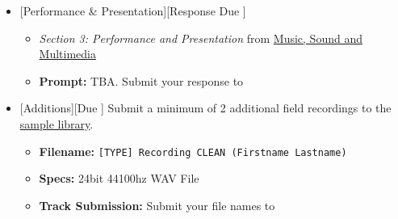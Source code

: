 \begin{itemize}[noitemsep,topsep=0pt,leftmargin=*]
\item {}[Performance \& Presentation][Response Due \dMon]
\begin{itemize}
	\item \emph{Section 3: Performance and Presentation} from \href{supplements/Music_Sound_and_Multimedia_-_From_the_Live_to_the_Virtual_(Music_and_the_Moving_Image)_(2008).pdf}{Music, Sound and Multimedia}
	\item \textbf{Prompt:} TBA. Submit your response to \discordR
\end{itemize}
\item {}[Additions][Due \dSun] \newline 
 Submit a minimum of 2 additional field recordings to the \href{\#}{sample library}.
\begin{itemize}
	\item \textbf{Filename:} \texttt{[TYPE] Recording CLEAN (Firstname Lastname)}
	\item \textbf{Specs:} 24bit 44100hz WAV File
	\item \textbf{Track Submission:} Submit your file names to \discordS
\end{itemize}
\end{itemize}